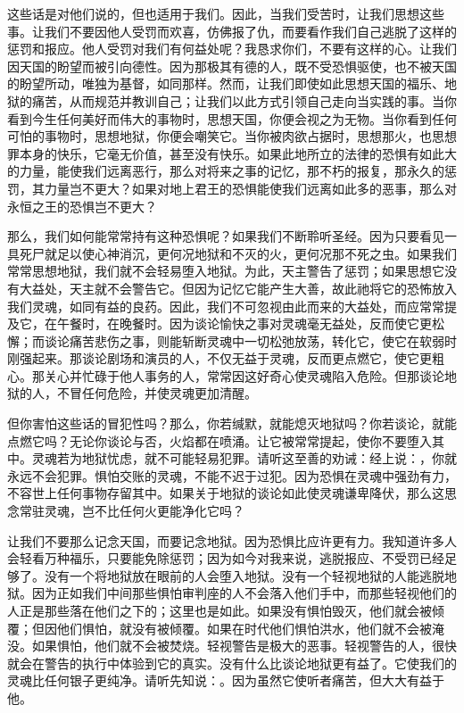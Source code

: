 这些话是对他们说的，但也适用于我们。因此，当我们受苦时，让我们思想这些事。让我们不要因他人受罚而欢喜，仿佛报了仇，而要看作我们自己逃脱了这样的惩罚和报应。他人受罚对我们有何益处呢？我恳求你们，不要有这样的心。让我们因天国的盼望而被引向德性。因为那极其有德的人，既不受恐惧驱使，也不被天国的盼望所动，唯独为基督，如同那样。然而，让我们即使如此思想天国的福乐、地狱的痛苦，从而规范并教训自己；让我们以此方式引领自己走向当实践的事。当你看到今生任何美好而伟大的事物时，思想天国，你便会视之为无物。当你看到任何可怕的事物时，思想地狱，你便会嘲笑它。当你被肉欲占据时，思想那火，也思想罪本身的快乐，它毫无价值，甚至没有快乐。如果此地所立的法律的恐惧有如此大的力量，能使我们远离恶行，那么对将来之事的记忆，那不朽的报复，那永久的惩罚，其力量岂不更大？如果对地上君王的恐惧能使我们远离如此多的恶事，那么对永恒之王的恐惧岂不更大？\par

那么，我们如何能常常持有这种恐惧呢？如果我们不断聆听圣经。因为只要看见一具死尸就足以使心神消沉，更何况地狱和不灭的火，更何况那不死之虫。如果我们常常思想地狱，我们就不会轻易堕入地狱。为此，天主警告了惩罚；如果思想它没有大益处，天主就不会警告它。但因为记忆它能产生大善，故此祂将它的恐怖放入我们灵魂，如同有益的良药。因此，我们不可忽视由此而来的大益处，而应常常提及它，在午餐时，在晚餐时。因为谈论愉快之事对灵魂毫无益处，反而使它更松懈；而谈论痛苦悲伤之事，则能斩断灵魂中一切松弛放荡，转化它，使它在软弱时刚强起来。那谈论剧场和演员的人，不仅无益于灵魂，反而更点燃它，使它更粗心。那关心并忙碌于他人事务的人，常常因这好奇心使灵魂陷入危险。但那谈论地狱的人，不冒任何危险，并使灵魂更加清醒。\par

但你害怕这些话的冒犯性吗？那么，你若缄默，就能熄灭地狱吗？你若谈论，就能点燃它吗？无论你谈论与否，火焰都在喷涌。让它被常常提起，使你不要堕入其中。灵魂若为地狱忧虑，就不可能轻易犯罪。请听这至善的劝诫：经上说：，你就永远不会犯罪。惧怕交账的灵魂，不能不迟于过犯。因为恐惧在灵魂中强劲有力，不容世上任何事物存留其中。如果关于地狱的谈论如此使灵魂谦卑降伏，那么这思念常驻灵魂，岂不比任何火更能净化它吗？\par

让我们不要那么记念天国，而要记念地狱。因为恐惧比应许更有力。我知道许多人会轻看万种福乐，只要能免除惩罚；因为如今对我来说，逃脱报应、不受罚已经足够了。没有一个将地狱放在眼前的人会堕入地狱。没有一个轻视地狱的人能逃脱地狱。因为正如我们中间那些惧怕审判座的人不会落入他们手中，而那些轻视他们的人正是那些落在他们之下的；这里也是如此。如果没有惧怕毁灭，他们就会被倾覆；但因他们惧怕，就没有被倾覆。如果在时代他们惧怕洪水，他们就不会被淹没。如果惧怕，他们就不会被焚烧。轻视警告是极大的恶事。轻视警告的人，很快就会在警告的执行中体验到它的真实。没有什么比谈论地狱更有益了。它使我们的灵魂比任何银子更纯净。请听先知说：。因为虽然它使听者痛苦，但大大有益于他。\par

